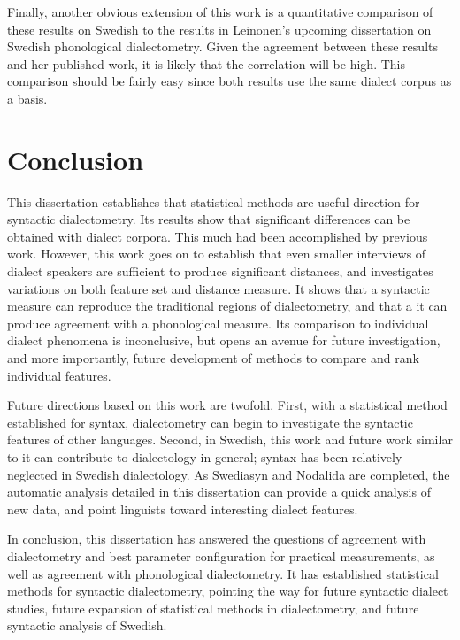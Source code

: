 Finally, another obvious extension of this work is a quantitative
comparison of these results on Swedish to the results in Leinonen's
upcoming dissertation on Swedish phonological dialectometry. Given the
agreement between these results and her published work, it is likely
that the correlation will be high. This comparison should be fairly
easy since both results use the same dialect corpus as a basis.

\section{Conclusion}

This dissertation establishes that statistical methods are useful
direction for syntactic dialectometry. Its results show that
significant differences can be obtained with dialect corpora. This
much had been accomplished by previous work. However, this work goes
on to establish that even smaller interviews of dialect speakers are
sufficient to produce significant distances, and investigates
variations on both feature set and distance measure. It shows that a
syntactic measure can reproduce the traditional regions of
dialectometry, and that a it can produce agreement with a phonological
measure. Its comparison to individual dialect phenomena is
inconclusive, but opens an avenue for future investigation, and more
importantly, future development of methods to compare and rank
individual features.

Future directions based on this work are twofold. First, with a
statistical method established for syntax, dialectometry can begin to
investigate the syntactic features of other languages. Second, in
Swedish, this work and future work similar to it can contribute to
dialectology in general; syntax has been relatively neglected in
Swedish dialectology. As Swediasyn and Nodalida are completed, the
automatic analysis detailed in this dissertation can provide a quick
analysis of new data, and point linguists toward interesting dialect
features.

In conclusion, this dissertation has answered the questions of
agreement with dialectometry and best parameter configuration for
practical measurements, as well as agreement with phonological
dialectometry. It has established statistical methods for syntactic
dialectometry, pointing the way for future syntactic dialect studies,
future expansion of statistical methods in dialectometry, and future
syntactic analysis of Swedish.

